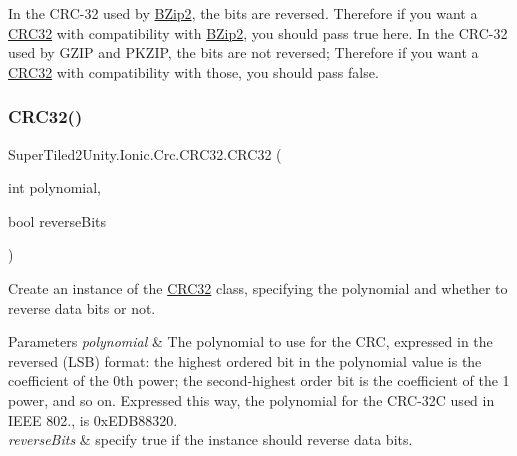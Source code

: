 In the C\+R\+C-\/32 used by \mbox{\hyperlink{namespace_super_tiled2_unity_1_1_ionic_1_1_b_zip2}{B\+Zip2}}, the bits are reversed. Therefore if you want a \mbox{\hyperlink{class_super_tiled2_unity_1_1_ionic_1_1_crc_1_1_c_r_c32}{C\+R\+C32}} with compatibility with \mbox{\hyperlink{namespace_super_tiled2_unity_1_1_ionic_1_1_b_zip2}{B\+Zip2}}, you should pass true here. In the C\+R\+C-\/32 used by G\+Z\+IP and P\+K\+Z\+IP, the bits are not reversed; Therefore if you want a \mbox{\hyperlink{class_super_tiled2_unity_1_1_ionic_1_1_crc_1_1_c_r_c32}{C\+R\+C32}} with compatibility with those, you should pass false. \mbox{\label{class_super_tiled2_unity_1_1_ionic_1_1_crc_1_1_c_r_c32_a55eee500667c8e6f5e1b53436829715b}} 
\subsubsection{\texorpdfstring{C\+R\+C32()}{CRC32()}\hspace{0.1cm}{\footnotesize\ttfamily [3/3]}}
{\footnotesize\ttfamily Super\+Tiled2\+Unity.\+Ionic.\+Crc.\+C\+R\+C32.\+C\+R\+C32 (\begin{DoxyParamCaption}\item[{int}]{polynomial,  }\item[{bool}]{reverse\+Bits }\end{DoxyParamCaption})}



Create an instance of the \mbox{\hyperlink{class_super_tiled2_unity_1_1_ionic_1_1_crc_1_1_c_r_c32}{C\+R\+C32}} class, specifying the polynomial and whether to reverse data bits or not. 


\begin{DoxyParams}{Parameters}
{\em polynomial} & The polynomial to use for the C\+RC, expressed in the reversed (L\+SB) format\+: the highest ordered bit in the polynomial value is the coefficient of the 0th power; the second-\/highest order bit is the coefficient of the 1 power, and so on. Expressed this way, the polynomial for the C\+R\+C-\/32C used in I\+E\+EE 802., is 0x\+E\+D\+B88320. \\
\hline
{\em reverse\+Bits} & specify true if the instance should reverse data bits. \\
\hline
\end{DoxyParams}



